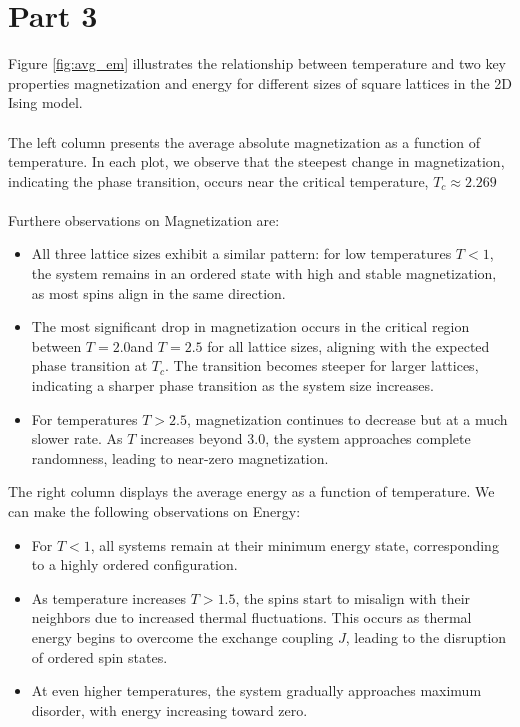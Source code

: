 \section*{Part 3}
Figure \ref{fig:avg_em} illustrates the relationship between temperature and two key properties magnetization and energy for different sizes of square lattices in the 2D Ising model.\\
\\
The left column presents the average absolute magnetization as a function of temperature. In each plot, we observe that the steepest change in magnetization, indicating the phase transition, occurs near the critical temperature, $T_c \approx 2.269$\\
\\
Furthere observations on Magnetization are:
\begin{itemize}
	\item All three lattice sizes exhibit a similar pattern: for low temperatures $T<1$, the system remains in an ordered state with high and stable magnetization, as most spins align in the same direction.
	\item The most significant drop in magnetization occurs in the critical region between $T= 2.0$and $T= 2.5$ for all lattice sizes, aligning with the expected phase transition at $T_c$. The transition becomes steeper for larger lattices, indicating a sharper phase transition as the system size increases. 
	\item For temperatures $T>2.5$, magnetization continues to decrease but at a much slower rate. As $T$ increases beyond $3.0$, the system approaches complete randomness, leading to near-zero magnetization. \end{itemize}
The right column displays the average energy as a function of temperature. We can make the following observations on Energy:
\begin{itemize} 
	\item For $T<1$, all systems remain at their minimum energy state, corresponding to a highly ordered configuration.
	\item As temperature increases $T>1.5$, the spins start to misalign with their neighbors due to increased thermal fluctuations. This occurs as thermal energy begins to overcome the exchange coupling $J$, leading to the disruption of ordered spin states. 
	\item At even higher temperatures, the system gradually approaches maximum disorder, with energy increasing toward zero. \end{itemize}

